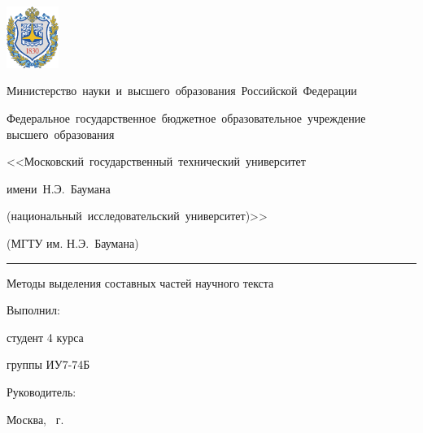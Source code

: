 \documentclass[gray]{beamer}
\begin{document}
\begingroup
{}
\begin{frame}
    \begin{minipage}{0.1\textwidth}
        \includegraphics[width=1.7cm]{img/bmstu.pdf}
    \end{minipage}
    \hfill
    \begin{minipage}{0.8\textwidth}\centering\bfseries
        {
            \linespread{1}\selectfont\tiny
            \vspace{0.1cm}
            {Министерство~науки~и~высшего~образования~Российской~Федерации}

            {Федеральное~государственное~бюджетное~образовательное~учреждение высшего~образования}

            {
                <<Московский~государственный~технический~университет

                имени~Н.Э.~Баумана

                (национальный~исследовательский~университет)>>
            }

            {(МГТУ им. Н.Э.~Баумана)}
            \vspace{0.1cm}
        }
    \end{minipage}

    \vspace{0.2cm}
    \rule[3ex]{\linewidth}{1pt}

    \vfill

    \begin{center}
    \Large Методы выделения составных частей научного текста
    \end{center}

    \vfill

    \begin{minipage}[t]{0.45\textwidth}
        \small
        \raggedright
        Выполнил:

        студент 4 курса

        группы ИУ7-74Б

    \end{minipage}
    \hfill
    \begin{minipage}[t]{0.45\textwidth}
        \small
        \raggedleft
        Руководитель:

    \end{minipage}

    \vfill

    \begin{center}
        Москва, \the\year\ г.
    \end{center}
\end{frame}
\endgroup
\end{document}
